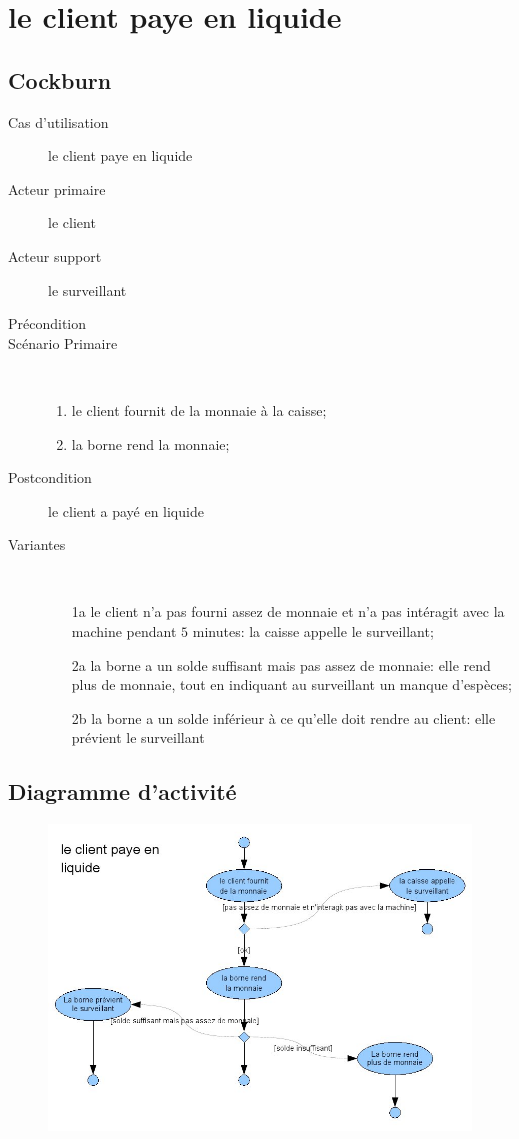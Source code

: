 \documentclass[a4paper]{article}
\begin{document}
\newpage

\section{le client paye en liquide}
\subsection{Cockburn}
\begin{description}
	\item[Cas d'utilisation] le client paye en liquide
	\item[Acteur primaire] le client
	\item[Acteur support] le surveillant
	\item[Pr\'econdition]
	\item[Sc\'enario Primaire] \
	\begin{enumerate}
		\item le client fournit de la monnaie \`a la caisse;
		\item la borne rend la monnaie;
	\end{enumerate}
	\item[Postcondition] le client a pay\'e en liquide
	\item[Variantes] \
	\begin{enumerate}
		\item[1a] le client n'a pas fourni assez de monnaie et n'a
			pas int\'eragit avec la machine pendant $5$ minutes: la
			caisse appelle le surveillant;
		\item[2a] la borne a un solde suffisant mais pas assez de
			monnaie: elle rend plus de monnaie, tout en indiquant au
			surveillant un manque d'esp\`eces;
		\item[2b] la borne a un solde inf\'erieur \`a ce qu'elle doit
			rendre au client: elle pr\'evient le surveillant
	\end{enumerate}
\end{description}

\subsection{Diagramme d'activit\'e}
\begin{figure}[!ht]
\centering
\includegraphics[scale=.5]{imgs/act_payerliquide.jpg}
\end{figure}
\end{document}
